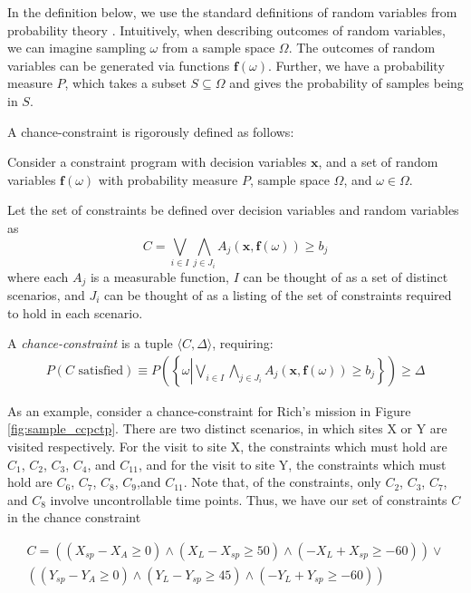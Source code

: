 \documentclass[jair,twoside,11pt,theapa]{article}
\begin{document}
In the definition below, we use the standard definitions of random variables
from probability theory \cite{durrett2010probability}. Intuitively, when
describing outcomes of random variables, we can imagine sampling $\omega$ from a
sample space $\Omega$. The outcomes of random variables can be generated via
functions $\mathbf{f}(\omega)$. Further, we have a probability measure $P$,
which takes a subset $S\subseteq \Omega$ and gives the probability of samples
being in $S$.

A chance-constraint is rigorously defined as follows:

\begin{mydef}
Consider a constraint program with decision variables $\mathbf{x}$, and a set of random variables $\mathbf{f}(\omega)$ with probability measure $P$, sample space $\Omega$, and $\omega\in \Omega$. 

Let the set of constraints be defined over decision variables and random variables as 
\[C = \bigvee_{i\in I}\bigwedge_{j\in J_i} A_j(\mathbf{x},\mathbf{f}(\omega))\geq b_j \]
where each $A_j$ is a measurable function, $I$ can be thought of as a set of distinct scenarios, and $J_i$ can be thought of as a listing of the set of constraints required to hold in each scenario.

A \emph{chance-constraint} is a tuple $\langle C, \Delta\rangle$, requiring:
\begin{align}
P(C\text{ satisfied}) \equiv P\left(\left\{\omega\left|\bigvee_{i\in I}\bigwedge_{j\in J_i} A_j(\mathbf{x},\mathbf{f}(\omega))\geq b_j \right.\right\}\right) \geq \Delta
\end{align}
\label{def:chance-constraint}
\end{mydef}

As an example, consider a chance-constraint for Rich's mission in Figure \ref{fig:sample_ccpctp}. There are two distinct scenarios, in which sites X or Y are visited respectively. For the visit to site X, the constraints which must hold are $C_1$, $C_2$, $C_3$, $C_4$, and $C_11$, and for the visit to site Y, the constraints which must hold are $C_6$, $C_7$, $C_8$, $C_9$,and $C_11$. Note that, of the constraints, only $C_2$, $C_3$, $C_7$, and $C_8$ involve uncontrollable time points. Thus, we have our set of constraints $C$ in the chance constraint


\begin{align*}
C = \left((X_{sp}-X_A\geq 0) \land (X_L-X_{sp}\geq 50) \land (-X_L+X_{sp}\geq -60) \right) \lor \\
\left((Y_{sp}-Y_A\geq 0)\land(Y_L-Y_{sp}\geq 45)\land(-Y_L+Y_{sp}\geq -60)\right)
\end{align*}
\end{document}
